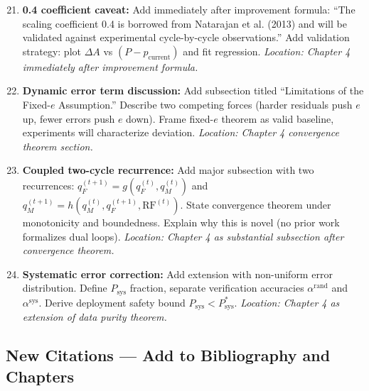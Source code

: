 \documentclass[11pt,a4paper]{article}
\begin{document}
\begin{enumerate}
\setcounter{enumi}{20}
\item \textbf{0.4 coefficient caveat:} Add immediately after improvement formula: ``The scaling coefficient 0.4 is borrowed from Natarajan et al. (2013) and will be validated against experimental cycle-by-cycle observations.'' Add validation strategy: plot $\Delta A$ vs $(P - p_{\text{current}})$ and fit regression. \textit{Location: Chapter 4 immediately after improvement formula.}

\item \textbf{Dynamic error term discussion:} Add subsection titled ``Limitations of the Fixed-$e$ Assumption.'' Describe two competing forces (harder residuals push $e$ up, fewer errors push $e$ down). Frame fixed-$e$ theorem as valid baseline, experiments will characterize deviation. \textit{Location: Chapter 4 convergence theorem section.}

\item \textbf{Coupled two-cycle recurrence:} Add major subsection with two recurrences: $q_F^{(t+1)} = g(q_F^{(t)}, q_M^{(t)})$ and $q_M^{(t+1)} = h(q_M^{(t)}, q_F^{(t+1)}, \text{RF}^{(t)})$. State convergence theorem under monotonicity and boundedness. Explain why this is novel (no prior work formalizes dual loops). \textit{Location: Chapter 4 as substantial subsection after convergence theorem.}

\item \textbf{Systematic error correction:} Add extension with non-uniform error distribution. Define $P_{\text{sys}}$ fraction, separate verification accuracies $\alpha^{\text{rand}}$ and $\alpha^{\text{sys}}$. Derive deployment safety bound $P_{\text{sys}} < P_{\text{sys}}^*$. \textit{Location: Chapter 4 as extension of data purity theorem.}
\end{enumerate}

\subsection{New Citations — Add to Bibliography and Chapters}
\end{document}
